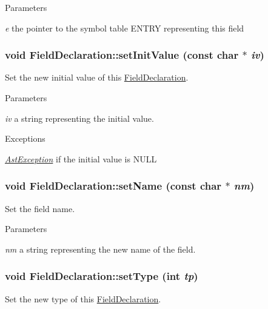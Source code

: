 \begin{DoxyParams}{Parameters}
\item[{\em e}]the pointer to the symbol table ENTRY representing this field \end{DoxyParams}
\hypertarget{classFieldDeclaration_a7b9500c22fec4f983f696751a2581fa7}{
\subsubsection[{setInitValue}]{\setlength{\rightskip}{0pt plus 5cm}void FieldDeclaration::setInitValue (const char $\ast$ {\em iv})}}
\label{classFieldDeclaration_a7b9500c22fec4f983f696751a2581fa7}
Set the new initial value of this \hyperlink{classFieldDeclaration}{FieldDeclaration}.


\begin{DoxyParams}{Parameters}
\item[{\em iv}]a string representing the initial value. \end{DoxyParams}

\begin{DoxyExceptions}{Exceptions}
\item[{\em \hyperlink{classAstException}{AstException}}]if the initial value is NULL \end{DoxyExceptions}
\hypertarget{classFieldDeclaration_a960feae9f9db3bda2fb1ff5d410c3613}{
\subsubsection[{setName}]{\setlength{\rightskip}{0pt plus 5cm}void FieldDeclaration::setName (const char $\ast$ {\em nm})}}
\label{classFieldDeclaration_a960feae9f9db3bda2fb1ff5d410c3613}
Set the field name.


\begin{DoxyParams}{Parameters}
\item[{\em nm}]a string representing the new name of the field. \end{DoxyParams}
\hypertarget{classFieldDeclaration_a0dd7650a679bfa235441789848a54740}{
\subsubsection[{setType}]{\setlength{\rightskip}{0pt plus 5cm}void FieldDeclaration::setType (int {\em tp})}}
\label{classFieldDeclaration_a0dd7650a679bfa235441789848a54740}
Set the new type of this \hyperlink{classFieldDeclaration}{FieldDeclaration}.



